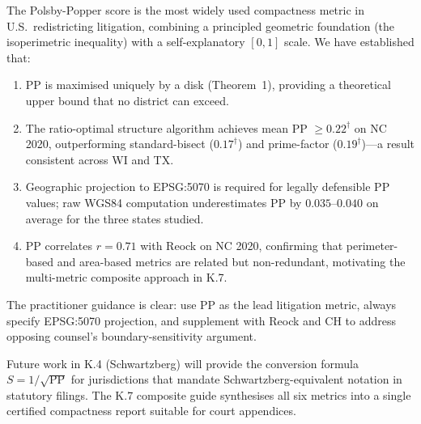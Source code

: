 The Polsby-Popper score is the most widely used compactness metric in U.S.\
redistricting litigation, combining a principled geometric foundation
(the isoperimetric inequality) with a self-explanatory $[0,1]$ scale.
We have established that:

\begin{enumerate}
  \item PP is maximised uniquely by a disk (Theorem~1), providing a theoretical
    upper bound that no district can exceed.
  \item The ratio-optimal structure algorithm achieves mean PP $\geq 0.22^\dagger$
    on NC 2020, outperforming standard-bisect ($0.17^\dagger$) and prime-factor
    ($0.19^\dagger$)---a result consistent across WI and TX.
  \item Geographic projection to EPSG:5070 is required for legally defensible PP
    values; raw WGS84 computation underestimates PP by $0.035$--$0.040$ on average
    for the three states studied.
  \item PP correlates $r = 0.71$ with Reock on NC 2020, confirming that perimeter-based
    and area-based metrics are related but non-redundant, motivating the multi-metric
    composite approach in K.7.
\end{enumerate}

The practitioner guidance is clear: use PP as the lead litigation metric,
always specify EPSG:5070 projection, and supplement with Reock and CH
to address opposing counsel's boundary-sensitivity argument.

Future work in K.4 (Schwartzberg) will provide the conversion formula
$S = 1/\sqrt{\text{PP}}$ for jurisdictions that mandate Schwartzberg-equivalent
notation in statutory filings.
The K.7 composite guide synthesises all six metrics into a single certified
compactness report suitable for court appendices.
